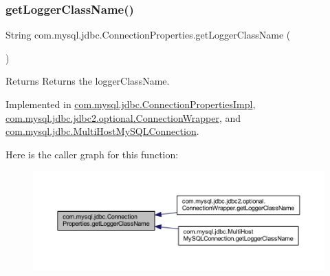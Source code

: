 \subsubsection{\texorpdfstring{get\+Logger\+Class\+Name()}{getLoggerClassName()}}
{\footnotesize\ttfamily String com.\+mysql.\+jdbc.\+Connection\+Properties.\+get\+Logger\+Class\+Name (\begin{DoxyParamCaption}{ }\end{DoxyParamCaption})}

\begin{DoxyReturn}{Returns}
Returns the logger\+Class\+Name. 
\end{DoxyReturn}


Implemented in \mbox{\hyperlink{classcom_1_1mysql_1_1jdbc_1_1_connection_properties_impl_a03a1c91c39ab31c5ea5ba74bd5c29c6c}{com.\+mysql.\+jdbc.\+Connection\+Properties\+Impl}}, \mbox{\hyperlink{classcom_1_1mysql_1_1jdbc_1_1jdbc2_1_1optional_1_1_connection_wrapper_a58f18c319fbdf5a591c9e602472e35da}{com.\+mysql.\+jdbc.\+jdbc2.\+optional.\+Connection\+Wrapper}}, and \mbox{\hyperlink{classcom_1_1mysql_1_1jdbc_1_1_multi_host_my_s_q_l_connection_a8b34b98a48ebd5bc0d397017926d007d}{com.\+mysql.\+jdbc.\+Multi\+Host\+My\+S\+Q\+L\+Connection}}.

Here is the caller graph for this function\+:\nopagebreak
\begin{figure}[H]
\begin{center}
\leavevmode
\includegraphics[width=350pt]{interfacecom_1_1mysql_1_1jdbc_1_1_connection_properties_aab196f0a4527adf8f56c13b2530fbd23_icgraph}
\end{center}
\end{figure}
\mbox{\label{interfacecom_1_1mysql_1_1jdbc_1_1_connection_properties_a82c72191f1132e06d2bbe504acde3399}} 
